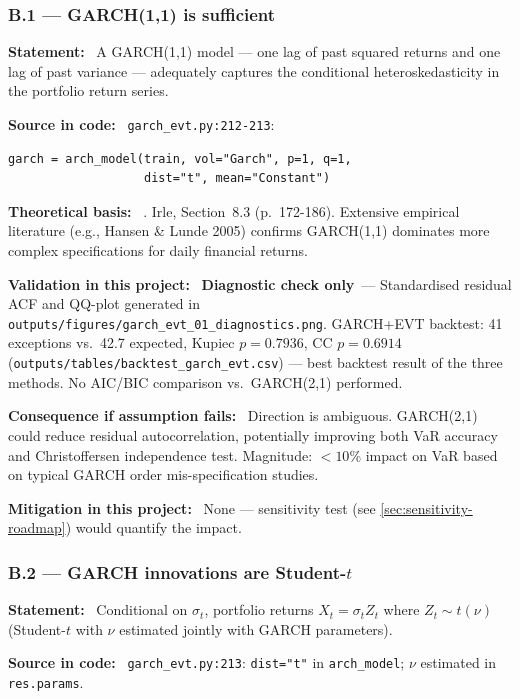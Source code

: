 \documentclass[11pt,a4paper]{article}
\newcommand{\asmfield}[1]{\medskip\noindent\textbf{#1:}\ }
\newcommand{\code}[1]{\texttt{#1}}
\newcommand{\diagnostic}{\textbf{Diagnostic check only}}
\begin{document}
\subsubsection{B.1 --- GARCH(1,1) is sufficient}\label{asm:B1}

\asmfield{Statement}
A GARCH(1,1) model --- one lag of past squared returns and one lag of
past variance --- adequately captures the conditional heteroskedasticity
in the portfolio return series.

\asmfield{Source in code}
\code{garch\_evt.py:212-213}:
\begin{lstlisting}
garch = arch_model(train, vol="Garch", p=1, q=1,
                   dist="t", mean="Constant")
\end{lstlisting}

\asmfield{Theoretical basis}
\cite{Bollerslev1986}. Irle, Section~8.3 (p.~172-186). Extensive
empirical literature (e.g., Hansen \& Lunde 2005) confirms GARCH(1,1)
dominates more complex specifications for daily financial returns.

\asmfield{Validation in this project}
\diagnostic\ --- Standardised residual ACF and QQ-plot generated in
\code{outputs/figures/garch\_evt\_01\_diagnostics.png}. GARCH+EVT
backtest: 41 exceptions vs.\ 42.7 expected, Kupiec $p = 0.7936$, CC
$p = 0.6914$ (\code{outputs/tables/backtest\_garch\_evt.csv}) --- best
backtest result of the three methods. No AIC/BIC comparison vs.\
GARCH(2,1) performed.

\asmfield{Consequence if assumption fails}
Direction is ambiguous. GARCH(2,1) could reduce residual autocorrelation,
potentially improving both VaR accuracy and Christoffersen independence
test. Magnitude: $< 10\%$ impact on VaR based on typical GARCH order
mis-specification studies.

\asmfield{Mitigation in this project}
None --- sensitivity test (see \cref{sec:sensitivity-roadmap}) would
quantify the impact.

\subsubsection{B.2 --- GARCH innovations are Student-$t$}\label{asm:B2}

\asmfield{Statement}
Conditional on $\sigma_t$, portfolio returns $X_t = \sigma_t Z_t$ where
$Z_t \sim t(\nu)$ (Student-$t$ with $\nu$ estimated jointly with GARCH
parameters).

\asmfield{Source in code}
\code{garch\_evt.py:213}: \lstinline|dist="t"| in \code{arch\_model};
$\nu$ estimated in \code{res.params}.
\end{document}
